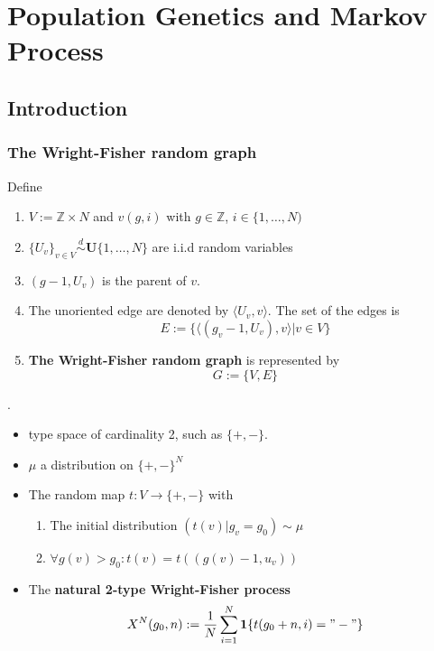 \chapter[Population Genetics]{Population Genetics and Markov Process}
\section{Introduction}
\subsection{The Wright-Fisher random graph}
\begin{definition}
	Define
	\begin{enumerate}
		\item $V:= \mathbb{Z} \times N$ and $v(g, i)$ with $g \in \mathbb{Z}$, $i \in \{1, \dots, N)$
		\item $\{U_v\}_{v \in V} \overset{d}{\sim} \textbf{U}\{1, \dots, N \}$ are i.i.d random variables
		\item $(g - 1, U_v)$ is the parent of $v$.
		\item The unoriented edge are denoted by $\langle U_v, v \rangle$. The set of the edges is  
			\begin{equation*}
				E:= \{\langle (g_v - 1, U_v), v \rangle | v \in V \}
			\end{equation*}
		\item \textbf{The Wright-Fisher random graph} is represented by 
		 \begin{equation*}
		 	 G := \{V, E\}
		 \end{equation*}
	\end{enumerate}
\end{definition}

\begin{definition}.
\begin{itemize}
	\item type space of cardinality 2, such as $\{+, - \}$.
	\item $\mu$ a distribution on $\{+ , -\}^N$
	\item The random map $t: V \rightarrow \{+, -\}$ with 
	\begin{enumerate}
		\item The initial distribution $(t(v) | g_{v} = g_0 ) \sim \mu$
		\item $\forall g(v) > g_0: t(v) = t((g(v) - 1, u_v))$
	\end{enumerate}
	\item The \textbf{natural 2-type Wright-Fisher process}
	\begin{equation*}
		X^N(g_0, n) := \frac{1}{N}\sum_{i = 1}^N \textbf{1}\{t(g_0 + n, i) = "-"\}
	\end{equation*}
\end{itemize}
\end{definition}

